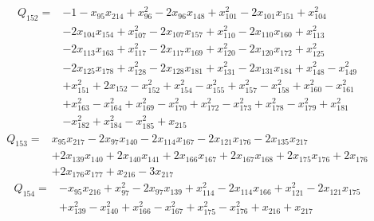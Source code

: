 \begin{equation*}\begin{aligned}
Q_{152}={}& -1-x_{95}x_{214}+x_{96}^{2}-2x_{96}x_{148}+x_{101}^{2}-2x_{101}x_{151}+x_{104}^{2}\\
& -2x_{104}x_{154}+x_{107}^{2}-2x_{107}x_{157}+x_{110}^{2}-2x_{110}x_{160}+x_{113}^{2}\\
& -2x_{113}x_{163}+x_{117}^{2}-2x_{117}x_{169}+x_{120}^{2}-2x_{120}x_{172}+x_{125}^{2}\\
& -2x_{125}x_{178}+x_{128}^{2}-2x_{128}x_{181}+x_{131}^{2}-2x_{131}x_{184}+x_{148}^{2}-x_{149}^{2}\\
& +x_{151}^{2}+2x_{152}-x_{152}^{2}+x_{154}^{2}-x_{155}^{2}+x_{157}^{2}-x_{158}^{2}+x_{160}^{2}-x_{161}^{2}\\
& +x_{163}^{2}-x_{164}^{2}+x_{169}^{2}-x_{170}^{2}+x_{172}^{2}-x_{173}^{2}+x_{178}^{2}-x_{179}^{2}+x_{181}^{2}\\
& -x_{182}^{2}+x_{184}^{2}-x_{185}^{2}+x_{215}
\end{aligned}\end{equation*}
\begin{equation*}\begin{aligned}
Q_{153}={}& x_{95}x_{217}-2x_{97}x_{140}-2x_{114}x_{167}-2x_{121}x_{176}-2x_{135}x_{217}\\
& +2x_{139}x_{140}+2x_{140}x_{141}+2x_{166}x_{167}+2x_{167}x_{168}+2x_{175}x_{176}+2x_{176}\\
& +2x_{176}x_{177}+x_{216}-3x_{217}
\end{aligned}\end{equation*}
\begin{equation*}\begin{aligned}
Q_{154}={}& -x_{95}x_{216}+x_{97}^{2}-2x_{97}x_{139}+x_{114}^{2}-2x_{114}x_{166}+x_{121}^{2}-2x_{121}x_{175}\\
& +x_{139}^{2}-x_{140}^{2}+x_{166}^{2}-x_{167}^{2}+x_{175}^{2}-x_{176}^{2}+x_{216}+x_{217}
\end{aligned}\end{equation*}
